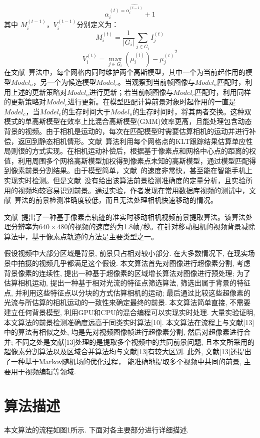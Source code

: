 $$ \alpha_i^{(t) = \hat{\alpha_i^{(t-1)}}}+1$$
其中 $M_i^{(t-1)}$，$V_i^{(t-1)}$分别定义为：
$$ M_i^{(t)} = \frac{1}{|G_i|}\sum_{j\in G_i}I_j^{(t)}$$
$$ V_i^{(t)} = \max_{j \in G_i}{(\mu_i^{(i)})-\mu_j^{(t)}}^2 $$
在文献~算法中，每个网格内同时维护两个高斯模型，其中一个为当前起作用的模型$Model_a$，另一个为候选模型$Model_c$。当观察到当前帧图像与$Model_a$匹配时，利用上述的更新策略对$Model_a$进行更新；若当前帧图像与$Model_c$匹配时，利用同样的更新策略对$Model_c$进行更新。在模型匹配计算前景对象时起作用的一直是$Model_c$，当$Model_c$的生存时间大于$Model_s$的生存时间时，将其两者交换。这种双模式的单高斯模型在效率上比混合高斯模型(GMM)效率更高，且能处理包含动态背景的视频。由于相机是运动的，每次在匹配模型时需要估算相机的运动并进行补偿，返回到静态相机情形。文献~算法利用每个网格点的KLT跟踪结果估算单应性局则很的方式实现。在相机运动补偿后，根据基于像素点和网格中心点的距离的权值，利用周围多个网格高斯模型加权得到像素点未知的高斯模型，通过模型匹配得到像素前景分割结果。由于模型简单，文献~的速度非常快，甚至能在智能手机上实现实时检测。但是文献~没有给出该算法前景检测准确度的定量分析，且实验所用的视频均较容易识别前景。通过实验，作者发现在常用数据库视频的测试中，文献~算法的前景检测准确度较低，而且无法处理相机快速移动的情况。\par

文献~\cite{ACPRRealTime}提出了一种基于像素点轨迹的准实时移动相机视频前景提取算法。该算法处理分辨率为$640 \times 480$的视频的速度约为1.8帧/秒。在针对移动相机的视频背景减除算法中，基于像素点轨迹的方法是主要类型之一。



假设视频中大部分区域是背景, 前景只占相对较小部分. 在大多数情况下, 在现实场景中拍摄的视频几乎都满足这个假设. 本文算法首先对图像进行超像素分割, 考虑背景像素的连续性, 提出一种基于超像素的区域增长算法对图像进行预处理; 为了估算相机运动, 提出一种基于相对光流的特征点筛选算法, 筛选出属于背景的特征点, 并利用这些特征点以分块的方式估算相机的运动; 最后通过比较这些超像素的光流与所估算的相机运动的一致性来确定最终的前景. 本文算法简单直接, 不需要建立任何背景模型, 利用GPU和CPU的混合编程可以实现实时处理. 大量实验证明, 本文算法的前景检测准确度远高于同类实时算法[10]. 本文算法在流程上与文献[13]中的算法有相似之处, 均是先对视频图像帧进行超像素分割, 然后对超像素进行合并; 不同之处是文献[13]处理的是提取多个视频中的共同前景问题, 且本文所采用的超像素分割算法以及区域合并算法均与文献[13]有较大区别. 此外, 文献[13]还提出了一种基于Markov随机场的优化过程， 能准确地提取多个视频中共同的前景, 主要用于视频编辑等领域.
\section{算法描述}
\label{ch5:sec:algorithm}
本文算法的流程如图1所示. 下面对各主要部分进行详细描述.

